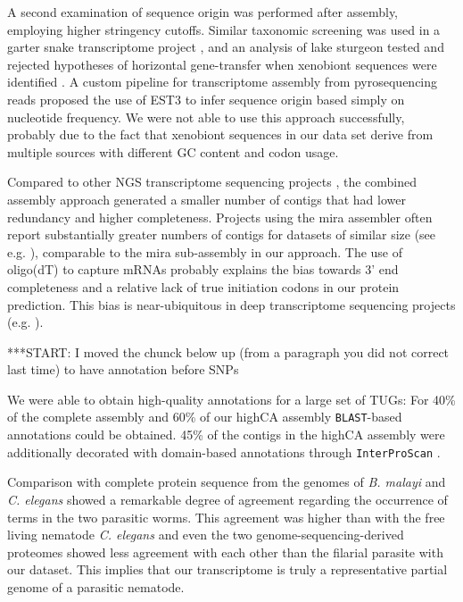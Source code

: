 \documentclass[10pt]{bmc_article}
\newenvironment{bmcformat}{\begin{raggedright}\baselineskip20pt\sloppy\setboolean{publ}{false}}{\end{raggedright}\baselineskip20pt\sloppy}
\begin{document}
\begin{bmcformat}
A second examination of sequence origin was performed after assembly,
employing higher stringency cutoffs.  Similar taxonomic screening was
used in a garter snake transcriptome project \cite{pmid21138572}, and
an analysis of lake sturgeon tested and rejected hypotheses of
horizontal gene-transfer when xenobiont sequences were identified
\cite{pmid20386959}. A custom pipeline for transcriptome assembly from
pyrosequencing reads \cite{pmid20034392} proposed the use of EST3
\cite{pmid17218127} to infer sequence origin based simply on
nucleotide frequency. We were not able to use this approach
successfully, probably due to the fact that xenobiont sequences in our
data set derive from multiple sources with different GC content and
codon usage.

Compared to other NGS transcriptome sequencing projects
\cite{pmid20478048}, the combined assembly approach generated a
smaller number of contigs that had lower redundancy and higher
completeness. Projects using the mira assembler often report
substantially greater numbers of contigs for datasets of similar size
(see e.g. \cite{pmid21364769}), comparable to the mira sub-assembly in
our approach. The use of oligo(dT) to capture mRNAs probably explains
the bias towards 3' end completeness and a relative lack of true
initiation codons in our protein prediction. This bias is
near-ubiquitous in deep transcriptome sequencing projects
(e.g. \cite{pmid20331785}).

***START: I moved the chunck below up (from a paragraph you did not
correct last time) to have annotation before SNPs

We were able to obtain high-quality annotations for a large set of
TUGs: For 40\% of the complete assembly and 60\% of our highCA assembly
\texttt{BLAST}-based annotations could be obtained. 45\% of the
contigs in the highCA assembly were additionally decorated with
domain-based annotations through \texttt{InterProScan}
\cite{pmid11590104}.

Comparison with complete protein sequence from the genomes of
\textit{B. malayi} and \textit{C. elegans} showed a remarkable degree
of agreement regarding the occurrence of terms in the two parasitic
worms. This agreement was higher than with the free living nematode
\textit{C. elegans} and even the two genome-sequencing-derived
proteomes showed less agreement with each other than the filarial
parasite with our dataset. This implies that our transcriptome is
truly a representative partial genome
\cite{parkinson_partigene--constructing_2004} of a parasitic nematode.


\end{bmcformat}
\end{document}
